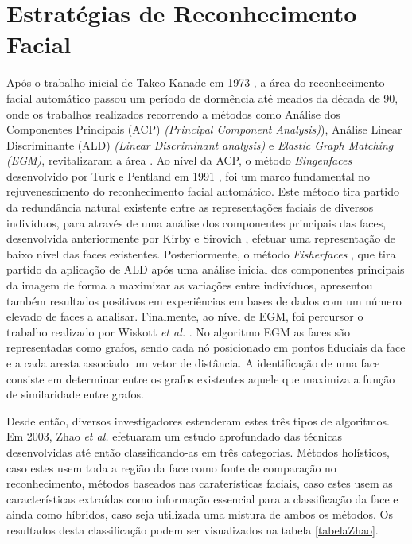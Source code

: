 \section{Estratégias de Reconhecimento Facial}\label{sec:estratégias}
Após o trabalho inicial de Takeo Kanade em 1973 \citep{Kanade1973}, a área do reconhecimento facial automático passou um período de dormência até meados da década de 90, onde os trabalhos realizados recorrendo a métodos como Análise dos Componentes Principais (ACP) \textit{(Principal Component Analysis)}), Análise Linear Discriminante (ALD) \textit{(Linear Discriminant analysis)} e \textit{Elastic Graph Matching (EGM)}, revitalizaram a área \citep{Chellappa2010}. Ao nível da ACP, o método
 \textit{Eingenfaces} desenvolvido por Turk e Pentland em 1991 \cite{Turk1991}, foi um marco fundamental no rejuvenescimento do reconhecimento facial automático. Este método tira partido da redundância natural existente entre as representações faciais de diversos indivíduos, para através de uma análise dos componentes principais das faces, desenvolvida anteriormente por Kirby e Sirovich  \cite{Kirby1990}, efetuar uma representação de baixo nível das faces existentes. Posteriormente, o método \textit{Fisherfaces} \cite{Belhumeur1997, Etemad1997, Zhao1998}, que tira partido da aplicação de ALD após uma análise inicial dos componentes principais da imagem de forma a maximizar as variações entre indivíduos, apresentou também resultados positivos em experiências em bases de dados com um número elevado de faces a analisar. Finalmente, ao nível de EGM, foi percursor o trabalho realizado por Wiskott \textit{et al.} \cite{wiskott1997face}. No algoritmo EGM as faces são representadas como grafos, sendo cada nó posicionado em pontos fiduciais da face e a cada aresta associado um vetor de distância. A identificação de uma face consiste em determinar entre os grafos existentes aquele que maximiza a função de similaridade entre grafos.
 
Desde então, diversos investigadores estenderam estes três tipos de algoritmos. Em 2003, Zhao \textit{et al.} \citep{Zhao2003} efetuaram um estudo aprofundado das técnicas desenvolvidas até então classificando-as em três categorias. Métodos holísticos, caso estes usem toda a região da face como fonte de comparação no reconhecimento, métodos baseados nas caraterísticas faciais, caso estes usem as características extraídas como informação essencial para a classificação da face e ainda como híbridos, caso seja utilizada uma mistura de ambos os métodos. Os resultados desta classificação podem ser visualizados na tabela \ref{tabelaZhao}.

